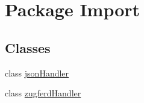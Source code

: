 \hypertarget{namespace_import}{}\section{Package Import}
\label{namespace_import}
\subsection*{Classes}
\begin{DoxyCompactItemize}
\item 
class \hyperlink{class_import_1_1json_handler}{json\+Handler}
\item 
class \hyperlink{class_import_1_1zugferd_handler}{zugferd\+Handler}
\end{DoxyCompactItemize}
